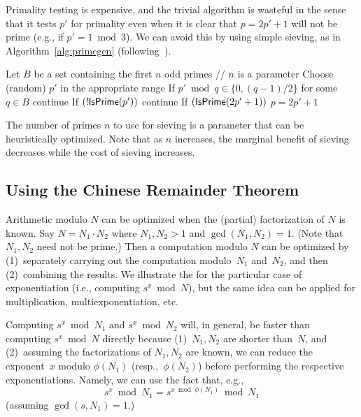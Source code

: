 \documentclass[11pt]{article}
\newcommand{\ignore}[1]{}
\newcommand{\?}[1]{\stackrel{?}{#1}}
\begin{document}
\ignore{
\begin{algorithm}
\caption{Generating a (random) safe prime}\label{alg:primegen-trivial}
\begin{algorithmic}[1]
\While{(1)}
\State Choose (random) $p'$ in the appropriate range
\State if $(!\isprime(p'))$ {\sf continue}
\State if $(\isprime(2p'+1))$ \Return $p=2p'+1$
\EndWhile
\end{algorithmic}
\end{algorithm}
}

Primality testing is expensive, and the trivial algorithm is wasteful in the sense that it tests $p'$ for primality even when it is clear that $p=2p'+1$ will not be prime (e.g., if $p'=1 \bmod 3$).
We can avoid this by using simple sieving, as in Algorithm~\ref{alg:primegen} (following~\cite{safe-primes}).

\begin{algorithm}
\caption{Generating a (random) safe prime}\label{alg:primegen}
\begin{algorithmic}[1]
\State Let $B$ be a set containing the first $n$ odd primes \;\;\; // $n$ is a parameter
\State Choose (random) $p'$ in the appropriate range
\State If $p' \bmod q \in \{0, (q-1)/2\}$ for some $q \in B$ {\sf continue}
\State If $(!\isprime(p'))$ {\sf continue}
\State If $(\isprime(2p'+1))$ \Return $p=2p'+1$
\EndWhile
\end{algorithmic}
\end{algorithm}

The number of primes $n$ to use for sieving is a parameter that can be heuristically optimized. Note that as $n$ increases, the marginal benefit of sieving decreases while the cost of sieving increases.

\subsection{Using the Chinese Remainder Theorem}
\label{sec:CRT}
Arithmetic modulo $N$ can be optimized when the (partial) factorization of $N$ is known.
Say $N=N_1\cdot N_2$ where $N_1, N_2 > 1$ and $\gcd(N_1, N_2)=1$. (Note that $N_1, N_2$ need not be prime.)
Then a computation modulo $N$ can be optimized by (1)~separately carrying out the computation modulo~$N_1$ and~$N_2$, and then (2)~combining the results.
We illustrate the for the particular case of exponentiation (i.e., computing
$s^x \bmod N$), but the same idea can be applied for multiplication, multiexponentiation, etc.

\medskip{}
Computing $s^x \bmod N_1$ and $s^x \bmod N_2$ will, in general, be faster than computing $s^x \bmod N$ directly because (1)~$N_1, N_2$ are shorter than~$N$, and (2)~assuming the factorizations of $N_1, N_2$ are known, we can reduce the exponent~$x$ modulo $\phi(N_1)$ (resp.,~$\phi(N_2)$) before performing the respective exponentiations.
Namely, we can use the fact that, e.g., 
\[s^x \bmod N_1 = s^{x \bmod \phi(N_1)} \bmod N_1\]
(assuming $\gcd(s, N_1)=1$.)
\end{document}
